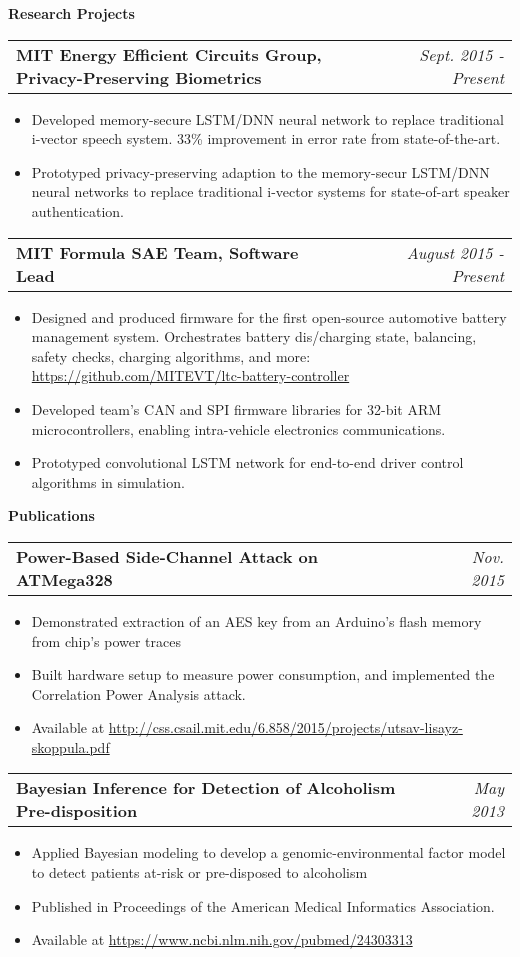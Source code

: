 \documentclass[letterpaper,11pt]{article}
\makeatletter
\newcommand{\resitem}[1]{\item[--] #1 \vspace{-4pt}}
\newcommand{\ressubheadingtwo}[2] {
\begin{tabular*}{7in}{l@{\extracolsep{\fill}}r}
	\textbf{#1} & \textit{#2} \\
\end{tabular*}\vspace{-6pt}}
\makeatother
\begin{document}
    \vspace{0.05in}

\large \textbf{Research Projects\vspace{3mm}} \normalsize
    \vspace{0.05in}

	\ressubheadingtwo{MIT Energy Efficient Circuits Group, Privacy-Preserving Biometrics}{Sept. 2015 - Present}{}
	\begin{itemize}
            \resitem{Developed memory-secure LSTM/DNN neural network to replace traditional i-vector speech system. 33\% improvement in error rate from state-of-the-art.}
            \resitem{Prototyped privacy-preserving adaption to the memory-secur LSTM/DNN neural networks to replace traditional i-vector systems for state-of-art speaker authentication.}
	\end{itemize}

    \vspace{0.05in}
	\ressubheadingtwo{MIT Formula SAE Team, Software Lead}{August 2015 - Present}
	\begin{itemize}
            \resitem{Designed and produced firmware for the first open-source automotive battery management system. Orchestrates battery dis/charging state, balancing, safety checks, charging algorithms, and more: \url{https://github.com/MITEVT/ltc-battery-controller}}
		\resitem{Developed team's CAN and SPI firmware libraries for 32-bit ARM microcontrollers, enabling intra-vehicle electronics communications.}
        \resitem{Prototyped convolutional LSTM network for end-to-end driver control algorithms in simulation.}
	\end{itemize}

    \vspace{0.05in}


\large \textbf{Publications\vspace{3mm}} \normalsize
    \ressubheadingtwo{Power-Based Side-Channel Attack on ATMega328}{Nov. 2015}{}
	\begin{itemize}
            \resitem{Demonstrated extraction of an AES key from an Arduino's flash memory from chip's power traces}
            \resitem{Built hardware setup to measure power consumption, and implemented the Correlation Power Analysis attack.}
            \resitem{Available at \url{http://css.csail.mit.edu/6.858/2015/projects/utsav-lisayz-skoppula.pdf}}
	\end{itemize}
    \vspace{0.2in}
    \ressubheadingtwo{Bayesian Inference for Detection of Alcoholism Pre-disposition}{May 2013}{}
	\begin{itemize}
            \resitem{Applied Bayesian modeling to develop a genomic-environmental factor model to detect patients at-risk or pre-disposed to alcoholism}
            \resitem{Published in Proceedings of the American Medical Informatics Association.}
            \resitem{Available at \url{https://www.ncbi.nlm.nih.gov/pubmed/24303313}}
	\end{itemize}
\end{document}
